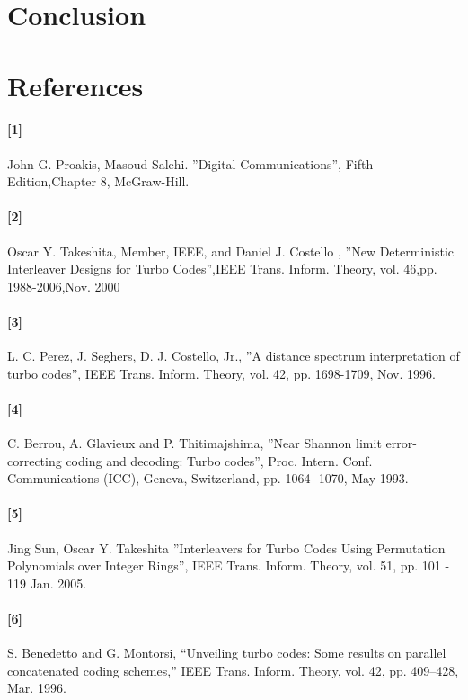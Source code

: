 \documentclass[twocolumn]{article}
\begin{document}
\section{Conclusion}

\section{References}
\paragraph{[1]}   John G. Proakis, Masoud Salehi. ''Digital Communications'', 
Fifth Edition,Chapter 8, McGraw-Hill.
\paragraph{[2]}  Oscar Y. Takeshita, Member, IEEE, and Daniel J. Costello ,
''New Deterministic Interleaver Designs for Turbo Codes'',IEEE Trans. Inform. 
Theory, vol.  46,pp. 1988-2006,Nov. 2000
\paragraph{[3]}  L. C. Perez, J. Seghers, D. J. Costello, Jr.,
 ''A distance spectrum interpretation of turbo codes'', IEEE Trans. Inform. Theory, 
 vol. 42, pp. 1698-1709, Nov. 1996.
\paragraph{[4]}  C. Berrou, A. Glavieux and P. Thitimajshima, 
''Near Shannon limit error-correcting coding and
decoding: Turbo codes'', Proc. Intern. Conf. Communications (ICC), Geneva, 
Switzerland, pp. 1064-
1070, May 1993. 
\paragraph{[5]}  Jing Sun, Oscar Y. Takeshita ''Interleavers for Turbo Codes Using 
Permutation Polynomials over Integer Rings'', IEEE Trans. Inform. Theory, vol. 51, 
pp. 101 - 119  Jan. 2005.
\paragraph{[6]} S. Benedetto and G. Montorsi, “Unveiling turbo codes: Some results
on parallel concatenated coding schemes,” IEEE Trans. Inform. Theory,
vol. 42, pp. 409–428, Mar. 1996.
\end{document}
